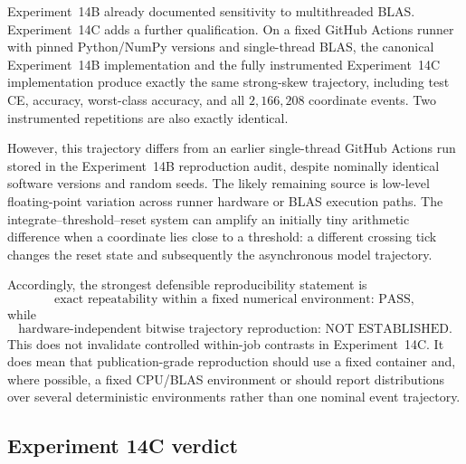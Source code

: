 Experiment~14B already documented sensitivity to multithreaded BLAS. Experiment~14C adds a further qualification. On a fixed GitHub Actions runner with pinned Python/NumPy versions and single-thread BLAS, the canonical Experiment~14B implementation and the fully instrumented Experiment~14C implementation produce exactly the same strong-skew trajectory, including test CE, accuracy, worst-class accuracy, and all $2{,}166{,}208$ coordinate events. Two instrumented repetitions are also exactly identical.

However, this trajectory differs from an earlier single-thread GitHub Actions run stored in the Experiment~14B reproduction audit, despite nominally identical software versions and random seeds. The likely remaining source is low-level floating-point variation across runner hardware or BLAS execution paths. The integrate--threshold--reset system can amplify an initially tiny arithmetic difference when a coordinate lies close to a threshold: a different crossing tick changes the reset state and subsequently the asynchronous model trajectory.

Accordingly, the strongest defensible reproducibility statement is
\begin{equation}
\boxed{\text{exact repeatability within a fixed numerical environment: PASS}},
\end{equation}
while
\begin{equation}
\boxed{\text{hardware-independent bitwise trajectory reproduction: NOT ESTABLISHED}.}
\end{equation}
This does not invalidate controlled within-job contrasts in Experiment~14C. It does mean that publication-grade reproduction should use a fixed container and, where possible, a fixed CPU/BLAS environment or should report distributions over several deterministic environments rather than one nominal event trajectory.

\subsection{Experiment 14C verdict}

